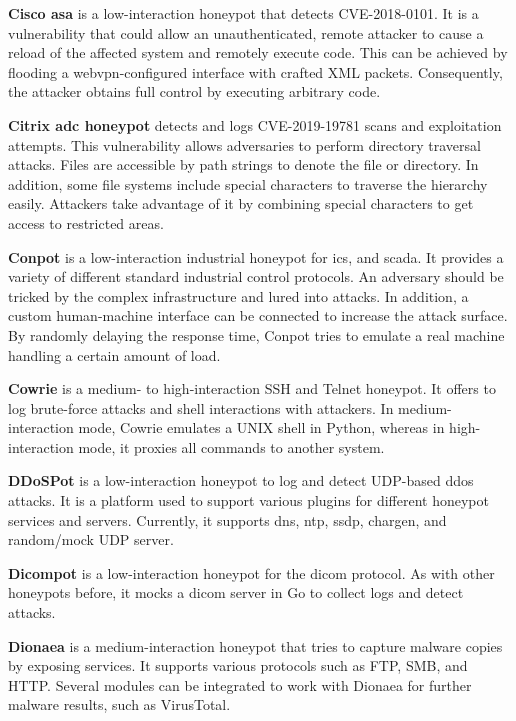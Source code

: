 \textbf{Cisco \ac{asa}} \cite{cymmetria2018} is a low-interaction honeypot that detects CVE-2018-0101\cite{CVE-2018-0101}.
It is a vulnerability that could allow an unauthenticated, remote attacker to cause a reload of the affected system and remotely execute code.
This can be achieved by flooding a webvpn-configured interface with crafted XML packets.
Consequently, the attacker obtains full control by executing arbitrary code.

\textbf{Citrix \ac{adc} honeypot} \cite{citrixhoneypot2020} detects and logs CVE-2019-19781\cite{CVE-2019-19781} scans and exploitation attempts.
This vulnerability allows adversaries to perform directory traversal attacks.
Files are accessible by path strings to denote the file or directory.
In addition, some file systems include special characters to traverse the hierarchy easily.
Attackers take advantage of it by combining special characters to get access to restricted areas. \cite{flanders2019}

\textbf{Conpot} \cite{conpot2021} is a low-interaction industrial honeypot for \ac{ics}, and \ac{scada}.
It provides a variety of different standard industrial control protocols.
An adversary should be tricked by the complex infrastructure and lured into attacks.
In addition, a custom human-machine interface can be connected to increase the attack surface.
By randomly delaying the response time, Conpot tries to emulate a real machine handling a certain amount of load.

\textbf{Cowrie} \cite{cowrie2021} is a medium- to high-interaction SSH and Telnet honeypot.
It offers to log brute-force attacks and shell interactions with attackers.
In medium-interaction mode, Cowrie emulates a UNIX shell in Python, whereas in high-interaction mode, it proxies all commands to another system.

\textbf{DDoSPot} \cite{ddosspot2021} is a low-interaction honeypot to log and detect UDP-based \ac{ddos} attacks.
It is a platform used to support various plugins for different honeypot services and servers.
Currently, it supports \acs{dns}, \acs{ntp}, \acs{ssdp}, \acs{chargen}, and random/mock UDP server.

\textbf{Dicompot} \cite{dicompot2021} is a low-interaction honeypot for the \ac{dicom} protocol.
As with other honeypots before, it mocks a \ac{dicom} server in Go to collect logs and detect attacks.

\textbf{Dionaea} \cite{dionaea2021} is a medium-interaction honeypot that tries to capture malware copies by exposing services.
It supports various protocols such as FTP, SMB, and HTTP.
Several modules can be integrated to work with Dionaea for further malware results, such as VirusTotal.

